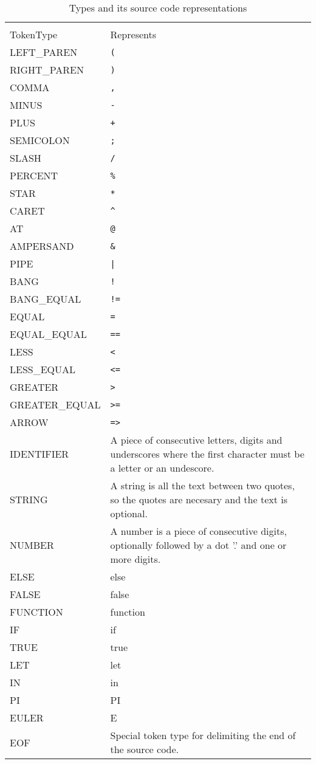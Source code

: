 \begin{table}
    \caption{Types and its source code representations}
    \begin{tabular}{| l | p{3in} |}
        \hline \\
        TokenType & Represents \\
        \hline
        LEFT\_PAREN & \verb|(|  \\
        RIGHT\_PAREN & \verb|)| \\
        COMMA & \verb|,| \\
        MINUS & \verb|-| \\
        PLUS & \verb|+| \\
        SEMICOLON & \verb|;| \\
        SLASH & \verb|/| \\
        PERCENT & \verb|%| \\
        STAR & \verb|*| \\
        CARET & \verb|^| \\
        AT & \verb|@| \\
        AMPERSAND & \verb|&| \\
        PIPE & \verb!|! \\
        BANG & \verb|!| \\
        BANG\_EQUAL & \verb|!=| \\
        EQUAL & \verb|=| \\
        EQUAL\_EQUAL & \verb|==| \\
        LESS & \verb|<| \\
        LESS\_EQUAL & \verb|<=| \\
        GREATER & \verb|>| \\
        GREATER\_EQUAL & \verb|>=| \\
        ARROW & \verb|=>| \\
        IDENTIFIER & A piece of consecutive letters, digits and underscores where the first character must be a letter or an undescore. \\
        STRING & A string is all the text between two quotes, so the quotes are necesary and the text is optional. \\
        NUMBER & A number is a piece of consecutive digits, optionally followed by a dot '.' and one or more digits. \\
        ELSE & else \\
        FALSE & false \\
        FUNCTION & function \\
        IF & if \\
        TRUE & true \\
        LET & let \\
        IN & in \\
        PI & PI \\
        EULER & E \\
        EOF & Special token type for delimiting the end of the source code. \\
        \hline
    \end{tabular}
\end{table}